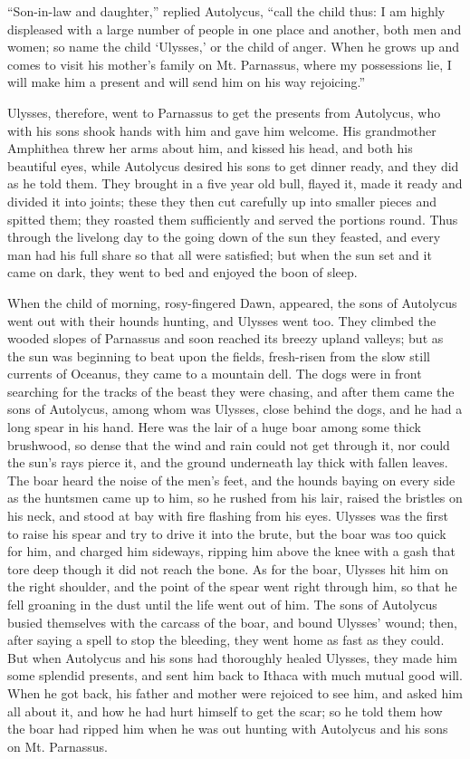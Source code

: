 “Son-in-law and daughter,” replied Autolycus, “call the child thus: I am highly
displeased with a large number of people in one place and another, both men and
women; so name the child ‘Ulysses,’ or the child of anger. When he grows up and
comes to visit his mother’s family on Mt. Parnassus, where my possessions lie,
I will make him a present and will send him on his way rejoicing.”

Ulysses, therefore, went to Parnassus to get the presents from Autolycus, who
with his sons shook hands with him and gave him welcome. His grandmother
Amphithea threw her arms about him, and kissed his head, and both his beautiful
eyes, while Autolycus desired his sons to get dinner ready, and they did as he
told them. They brought in a five year old bull, flayed it, made it ready and
divided it into joints; these they then cut carefully up into smaller pieces
and spitted them; they roasted them sufficiently and served the portions round.
Thus through the livelong day to the going down of the sun they feasted, and
every man had his full share so that all were satisfied; but when the sun set
and it came on dark, they went to bed and enjoyed the boon of sleep.

When the child of morning, rosy-fingered Dawn, appeared, the sons of Autolycus
went out with their hounds hunting, and Ulysses went too. They climbed the
wooded slopes of Parnassus and soon reached its breezy upland valleys; but as
the sun was beginning to beat upon the fields, fresh-risen from the slow still
currents of Oceanus, they came to a mountain dell. The dogs were in front
searching for the tracks of the beast they were chasing, and after them came
the sons of Autolycus, among whom was Ulysses, close behind the dogs, and he
had a long spear in his hand. Here was the lair of a huge boar among some thick
brushwood, so dense that the wind and rain could not get through it, nor could
the sun’s rays pierce it, and the ground underneath lay thick with fallen
leaves. The boar heard the noise of the men’s feet, and the hounds baying on
every side as the huntsmen came up to him, so he rushed from his lair, raised
the bristles on his neck, and stood at bay with fire flashing from his eyes.
Ulysses was the first to raise his spear and try to drive it into the brute,
but the boar was too quick for him, and charged him sideways, ripping him above
the knee with a gash that tore deep though it did not reach the bone. As for
the boar, Ulysses hit him on the right shoulder, and the point of the spear
went right through him, so that he fell groaning in the dust until the life
went out of him. The sons of Autolycus busied themselves with the carcass of
the boar, and bound Ulysses’ wound; then, after saying a spell to stop the
bleeding, they went home as fast as they could. But when Autolycus and his sons
had thoroughly healed Ulysses, they made him some splendid presents, and sent
him back to Ithaca with much mutual good will. When he got back, his father and
mother were rejoiced to see him, and asked him all about it, and how he had
hurt himself to get the scar; so he told them how the boar had ripped him when
he was out hunting with Autolycus and his sons on Mt. Parnassus.

